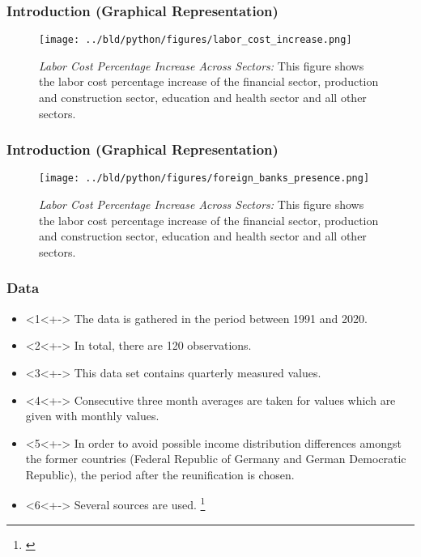 \documentclass[11pt]{beamer}
\begin{document}
\begin{frame}
\frametitle{Introduction (Graphical Representation)}
    \begin{figure}

        \centering
        \texttt{[image: ../bld/python/figures/labor\_cost\_increase.png]}

        \caption{\emph{Labor Cost Percentage Increase Across Sectors:} This figure shows the labor cost percentage increase of the financial sector, production and construction sector, education and health sector and all other sectors.}
        \label{fig:labor}

    \end{figure}
\end{frame}

\begin{frame}
\frametitle{Introduction (Graphical Representation)}
    \begin{figure}

        \centering
        \texttt{[image: ../bld/python/figures/foreign\_banks\_presence.png]}

        \caption{\emph{Labor Cost Percentage Increase Across Sectors:} This figure shows the labor cost percentage increase of the financial sector, production and construction sector, education and health sector and all other sectors.}
        \label{fig:foreign_banks_sector}

    \end{figure}
\end{frame}

\begin{frame}
\frametitle{Data}
\begin{itemize}
\item<1<+-> The data is gathered in the period between 1991 and 2020.
\item<2<+-> In total, there are 120 observations.
\item<3<+-> This data set contains quarterly measured values.
\item<4<+-> Consecutive three month averages are taken for values which are given with monthly values.
\item<5<+-> In order to avoid possible income distribution differences amongst the former countries (Federal Republic of Germany and German Democratic Republic), the period after the reunification is chosen.
\item<6<+-> Several sources are used. \footnote{\cite{DeutscheBundesbank,Eurostat,EuropeanCentralBank}}
\end{itemize}
\end{frame}
\end{document}
